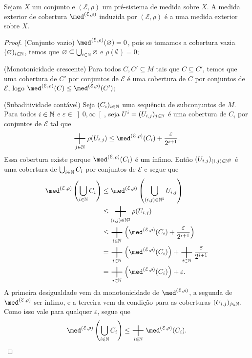 \begin{prop}
Sejam $X$ um conjunto e $(\mathcal E, \rho)$ um pré-sistema de medida sobre $X$. A medida exterior de cobertura $\med^{(\mathcal E, \rho)}$ induzida por $(\mathcal E, \rho)$ é a uma medida exterior sobre $X$.
\end{prop}
\begin{proof}
(Conjunto vazio) $\med^{(\mathcal E, \rho)}(\emptyset)=0$, pois se tomamos a cobertura vazia $(\varnothing)_{i \in \mathbb{N}}$, temos que $\varnothing \subseteq \bigcup_{i \in \mathbb{N}} \varnothing$ e $\rho(\emptyset)=0$;

(Monotonicidade crescente) Para todos $C,C' \subseteq M$ tais que $C \subseteq C'$, temos que uma cobertura de $C'$ por conjuntos de $\mathcal E$ é uma cobertura de $C$ por conjuntos de $\mathcal E$, logo $\med^{(\mathcal E, \rho)}(C) \leq \med^{(\mathcal E, \rho)}(C')$;

(Subaditividade contável) Seja $(C_i)_{i \in \mathbb{N}}$ uma sequência de subconjuntos de $M$. Para todos $i \in \mathbb{N}$ e $\varepsilon \in \left]0,\infty\right[$, seja $U^i=(U_{i,j})_{j \in \mathbb{N}}$ é uma cobertura de $C_i$ por conjuntos de $\mathcal E$ tal que
	\begin{equation*}
	\sum_{j \in \N} \rho(U_{i,j}) \leq \med^{(\mathcal E, \rho)}(C_i) + \frac{\varepsilon}{2^{i+1}}.
	\end{equation*}
Essa cobertura existe porque $\med^{(\mathcal E, \rho)}(C_i)$ é um ínfimo. Então $(U_{i,j})_{(i,j) \in \mathbb{N}^2}$ é uma cobertura de $\bigcup_{i \in \mathbb{N}} C_i$ por conjuntos de $\mathcal E$ e segue que
	\begin{align*}
	\med^{(\mathcal E, \rho)}\left( \bigcup_{i \in \N} C_i \right) &\leq \med^{(\mathcal E, \rho)}\left( \bigcup_{(i,j) \in \N^2} U_{i,j} \right) \\
		&\leq \sum_{(i,j) \in \N^2} \rho(U_{i,j}) \\
		&\leq \sum_{i \in \N} \left( \med^{(\mathcal E, \rho)}(C_i) + \frac{\varepsilon}{2^{i+1}} \right) \\
		&= \sum_{i \in \N} \left( \med^{(\mathcal E, \rho)}(C_i)\right) + \sum_{i \in \N}\frac{\varepsilon}{2^{i+1}} \\
		&= \sum_{i \in \N} \left( \med^{(\mathcal E, \rho)}(C_i)\right) + \varepsilon.
	\end{align*}
A primeira desigualdade vem da monotonicidade de $\med^{(\mathcal E, \rho)}$, a segunda de $\med^{(\mathcal E, \rho)}$ ser ínfimo, e a terceira vem da condição para as coberturas $(U_{i,j})_{j \in \mathbb{N}}$. Como isso vale para qualquer $\varepsilon$, segue que
	\begin{equation*}
	\med^{(\mathcal E, \rho)}\left( \bigcup_{i \in \N} C_i \right) \leq \sum_{i \in \N} \med^{(\mathcal E, \rho)}(C_i). \qedhere
	\end{equation*}
\end{proof}

